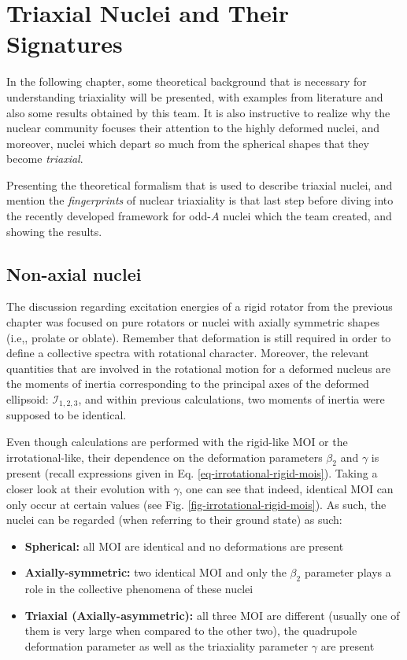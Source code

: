 \chapter{Triaxial Nuclei and Their Signatures}
\label{chapter4}
In the following chapter, some theoretical background that is necessary for understanding triaxiality will be presented, with examples from literature and also some results obtained by this team. It is also instructive to realize why the nuclear community focuses their attention to the highly deformed nuclei, and moreover, nuclei which depart so much from the spherical shapes that they become \emph{triaxial}.

Presenting the theoretical formalism that is used to describe triaxial nuclei, and mention the \emph{fingerprints} of nuclear triaxiality is that last step before diving into the recently developed framework for odd-$A$ nuclei which the team created, and showing the results. 

\section{Non-axial nuclei}

The discussion regarding excitation energies of a rigid rotator from the previous chapter was focused on pure rotators or nuclei with axially symmetric shapes (i.e,, prolate or oblate). Remember that deformation is still required in order to define a collective spectra with rotational character. Moreover, the relevant quantities that are involved in the rotational motion for a deformed nucleus are the moments of inertia corresponding to the principal axes of the deformed ellipsoid: $\mathcal{I}_{1,2,3}$, and within previous calculations, two moments of inertia were supposed to be identical.

Even though calculations are performed with the rigid-like MOI or the irrotational-like, their dependence on the deformation parameters $\beta_2$ and $\gamma$ is present (recall expressions given in Eq. \ref{eq-irrotational-rigid-mois}). Taking a closer look at their evolution with $\gamma$, one can see that indeed, identical MOI can only occur at certain values (see Fig. \ref{fig-irrotational-rigid-mois}). As such, the nuclei can be regarded (when referring to their ground state) as such:
\begin{itemize}
    \item \textbf{Spherical:} all MOI are identical and no deformations are present
    \item \textbf{Axially-symmetric:} two identical MOI and only the $\beta_2$ parameter plays a role in the collective phenomena of these nuclei
    \item \textbf{Triaxial (Axially-asymmetric):} all three MOI are different (usually one of them is very large when compared to the other two), the quadrupole deformation parameter as well as the triaxiality parameter $\gamma$ are present
\end{itemize}

